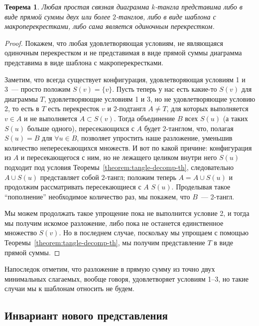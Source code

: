 \documentclass[12pt]{article}
\theoremstyle{plain}
\newtheorem{theorem}{Теорема}
\theoremstyle{definition}
\begin{document}
		\begin{theorem}
			\label{theorem:decomposition-existence}
			Любая простая связная диаграмма $k$-тангла представима либо в виде прямой суммы двух или более $2$-танглов, либо в виде
			шаблона с макроперекрестками, либо сама является одиночным перекрестком.
		\end{theorem}
		\begin{proof}
			Покажем, что любая удовлетворяющая условиям, не являющаяся одиночным перекрестком и не представимая в виде прямой суммы
			диаграмма представима в виде шаблона с макроперекрестками.
			
			Заметим, что всегда существует конфигурация,
			удовлетворяющая условиям 1 и 3~--- просто положим $S(v) = \{ v \}$. Пусть теперь у нас есть какие-то $S(v)$ для диаграммы
			$T$, удовлетворяющие условиям 1 и 3, но не удовлетворяющие условию 2, то есть в $T$ есть перекресток $v$ и $2$-подтангл
			$A \ne T$, для которых выполняется $v \in A$ и не выполняется $A \subset S(v)$. Тогда объединение $B$ всех $S(u)$ (а таких
			$S(u)$ больше одного), пересекающихся с $A$ будет $2$-танглом, что, полагая $S(u) = B$ для $\forall u \in B$, позволяет
			упростить наше разложение, уменьшив количество непересекающихся множеств. И вот по какой причине: конфигурация из $A$ и
			пересекающегося с ним, но не лежащего целиком внутри него $S(u)$ подходит под условия Теоремы~\ref{theorem:tangle-decomp-th},
			следовательно $A \cup S(u)$ представляет собой $2$-тангл; положим теперь $A = A \cup S(u)$ и продолжим рассматривать
			пересекающиеся с $A$ $S(u)$. Проделывая такое ``пополнение'' необходимое количество раз, мы покажем, что $B$~--- 2-тангл.

			Мы можем продолжать такое упрощение пока не выполнится условие 2, и тогда мы получим искомое разложение, либо пока не останется
			единственное множество $S(v)$. Но в последнем случае, поскольку мы упрощаем с помощью Теоремы~\ref{theorem:tangle-decomp-th},
			мы получим представление $T$ в виде прямой суммы.
		\end{proof}

		Напоследок отметим, что разложение в прямую сумму из точно двух минимальных слагаемых, вообще говоря, удовлетворяет условиям 1--3, но
		такие случаи мы к шаблонам относить не будем.

	\subsection{Инвариант нового представления}
	\label{subsection:root-code-decomp}
\end{document}
